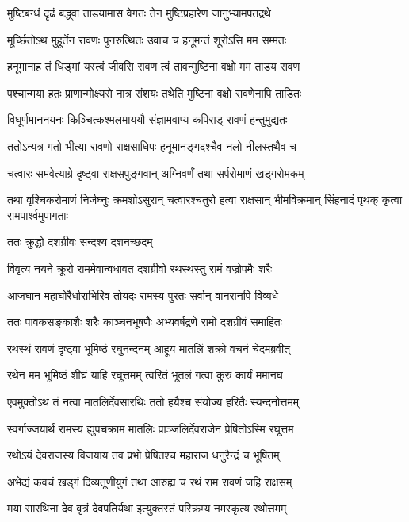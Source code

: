 \twolineshloka
{मुष्टिबन्धं दृढं बद्ध्वा ताडयामास वेगतः}
{तेन मुष्टिप्रहारेण जानुभ्यामपतद्रथे} %

\twolineshloka
{मूर्च्छितोऽथ मुहूर्तेन रावणः पुनरुत्थितः}
{उवाच च हनूमन्तं शूरोऽसि मम सम्मतः} %

\twolineshloka
{हनूमानाह तं धिङ्मां यस्त्वं जीवसि रावण}
{त्वं तावन्मुष्टिना वक्षो मम ताडय रावण} %

\twolineshloka
{पश्चान्मया हतः प्राणान्मोक्ष्यसे नात्र संशयः}
{तथेति मुष्टिना वक्षो रावणेनापि ताडितः} %

\twolineshloka
{विघूर्णमाननयनः किञ्चित्कश्मलमाययौ}
{संज्ञामवाप्य कपिराड् रावणं हन्तुमुद्यतः} %

\twolineshloka
{ततोऽन्यत्र गतो भीत्या रावणो राक्षसाधिपः}
{हनूमानङ्गदश्चैव नलो नीलस्तथैव च} %

\twolineshloka
{चत्वारः समवेत्याग्रे दृष्ट्वा राक्षसपुङ्गवान्}
{अग्निवर्णं तथा सर्परोमाणं खड्गरोमकम्} %

\threelineshloka
{तथा वृश्चिकरोमाणं निर्जघ्नुः क्रमशोऽसुरान्}
{चत्वारश्चतुरो हत्वा राक्षसान् भीमविक्रमान्}
{सिंहनादं पृथक् कृत्वा रामपार्श्वमुपागताः} %

\onelineshloka
{ततः क्रुद्धो दशग्रीवः सन्दश्य दशनच्छदम्} %

\twolineshloka
{विवृत्य नयने क्रूरो राममेवान्वधावत}
{दशग्रीवो रथस्थस्तु रामं वज्रोपमैः शरैः} %

\twolineshloka
{आजघान महाघोरैर्धाराभिरिव तोयदः}
{रामस्य पुरतः सर्वान् वानरानपि विव्यधे} %

\twolineshloka
{ततः पावकसङ्काशैः शरैः काञ्चनभूषणैः}
{अभ्यवर्षद्रणे रामो दशग्रीवं समाहितः} %

\twolineshloka
{रथस्थं रावणं दृष्ट्वा भूमिष्ठं रघुनन्दनम्}
{आहूय मातलिं शक्रो वचनं चेदमब्रवीत्} %

\twolineshloka
{रथेन मम भूमिष्ठं शीघ्रं याहि रघूत्तमम्}
{त्वरितं भूतलं गत्वा कुरु कार्यं ममानघ} %

\twolineshloka
{एवमुक्तोऽथ तं नत्वा मातलिर्देवसारथिः}
{ततो हयैश्च संयोज्य हरितैः स्यन्दनोत्तमम्} %

\twolineshloka
{स्वर्गाज्जयार्थं रामस्य ह्युपचक्राम मातलिः}
{प्राञ्जलिर्देवराजेन प्रेषितोऽस्मि रघूत्तम} %

\twolineshloka
{रथोऽयं देवराजस्य विजयाय तव प्रभो}
{प्रेषितश्च महाराज धनुरैन्द्रं च भूषितम्} %

\twolineshloka
{अभेद्यं कवचं खड्गं दिव्यतूणीयुगं तथा}
{आरुह्य च रथं राम रावणं जहि राक्षसम्} %

\twolineshloka
{मया सारथिना देव वृत्रं देवपतिर्यथा}
{इत्युक्तस्तं परिक्रम्य नमस्कृत्य रथोत्तमम्} %

